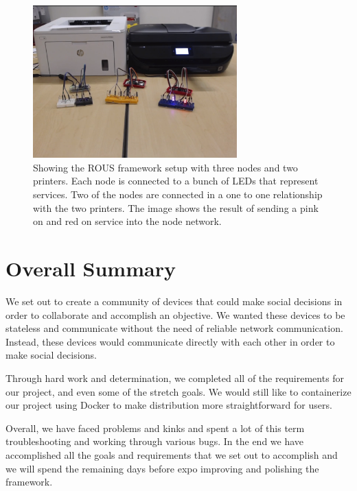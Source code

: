 \documentclass[draftclsnofoot, onecolumn, compsoc, 10pt]{IEEEtran}
\begin{document}
\begin{figure}[!htb]
\centering
	\includegraphics[width=0.7\textwidth]{setup}
	\caption{Showing the ROUS framework setup with three nodes and two printers. Each node is connected to a bunch of LEDs that represent services. Two of the nodes are connected in a one to one relationship with the two printers. The image shows the result of sending a pink on and red on service into the node network.}
\end{figure}

\section{Overall Summary}
We set out to create a community of devices that could make social decisions in order to collaborate and accomplish an objective. We wanted these devices to be stateless and communicate without the need of reliable network communication. Instead, these devices would communicate directly with each other in order to make social decisions.

Through hard work and determination, we completed all of the requirements for our project, and even some of the stretch goals. We would still like to containerize our project using Docker to make distribution more straightforward for users. 

Overall, we have faced problems and kinks and spent a lot of this term troubleshooting and working through various bugs. In the end we have accomplished all the goals and requirements that we set out to accomplish and we will spend the remaining days before expo improving and polishing the framework.
\end{document}
